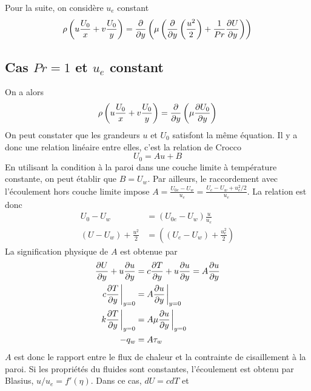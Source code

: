     Pour la suite, on considère $u_e$ constant
    \begin{equation}
      \rho \left(u\frac{U_0}{x} + v\frac{U_0}{y}\right) = \pdv{y}\left(\mu \left(\pdv{y} \left(\frac{u^2}{2}\right) + \frac{1}{Pr} \pdv{U}{y}\right)\right)
    \end{equation}

    \subsection{Cas $Pr = 1$  et $u_e$ constant}
      On a alors
      \begin{equation}
        \rho \left(u\frac{U_0}{x} + v\frac{U_0}{y}\right) = \pdv{y}\left(\mu \pdv{U_0}{y}\right)
      \end{equation}
      On peut constater que les grandeurs $u$ et $U_0$ satisfont la même équation. Il y a donc une relation linéaire entre elles, c'est la relation de Crocco
      \begin{equation}
        U_0 = A u + B
      \end{equation}
      En utilisant la condition à la paroi dans une couche limite à température constante, on peut établir que $B = U_w$. Par ailleurs, le raccordement avec l'écoulement hors couche limite impose $A = \frac{U_{0e} - U_w}{u_e} = \frac{U_e - U_w + u_e^2/2}{u_e}$.
      La relation est donc
      \begin{equation}
        \begin{aligned}
          U_0 - U_w &= (U_{0e} - U_w)\frac{u}{u_e}\\
          (U - U_w) + \frac{u^2}{2} &= \left((U_e - U_w) + \frac{u_e^2}{2}\right)
        \end{aligned}
      \end{equation}
      La signification physique de $A$ est obtenue par
      \begin{equation}
        \begin{aligned}
          \pdv{U}{y} + u \pdv{u}{y} &= c \pdv{T}{y} + u \pdv{u}{y} = A\pdv{u}{y}\\
          c \pdv{T}{y}\eval_{y=0} &= A\pdv{u}{y}\eval_{y=0}\\
          k \pdv{T}{y}\eval_{y=0} &= A\mu\pdv{u}{y}\eval_{y=0}\\
          -q_w &= A\tau_w
        \end{aligned}
      \end{equation}
      $A$ est donc le rapport entre le flux de chaleur et la contrainte de cisaillement à la paroi. Si les propriétés du fluides sont constantes, l'écoulement est obtenu par Blasius, $u/u_e = f'(\eta)$. Dans ce cas, $dU = cdT$ et
